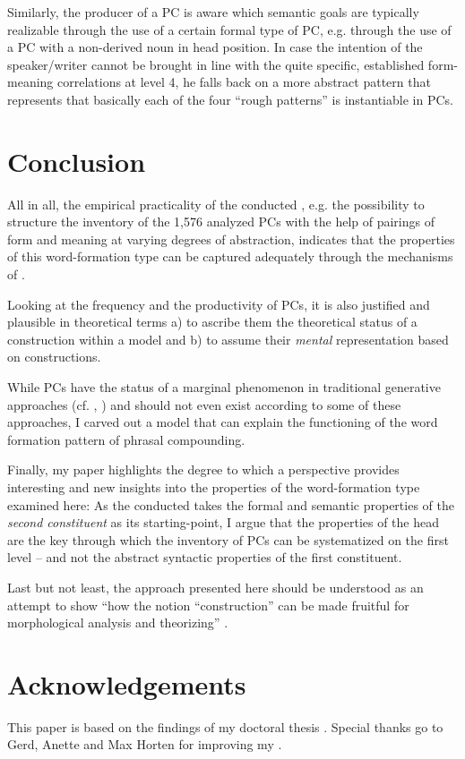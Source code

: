 \documentclass[output=paper]{LSP/langsci}
\begin{document}
Similarly, the producer of a PC is aware which semantic goals are typically realizable through the use of a certain formal type of PC, e.g. through the use of a PC with a non-derived noun in head position. In case the intention of the speaker\slash writer cannot be brought in line with the quite  specific, established form-meaning correlations at level 4,  he falls back on a more abstract pattern that represents that basically each of the four ``rough patterns'' is instantiable in PCs. 


\section{Conclusion}\label{sec:hein:4}
All in all, the empirical practicality of the conducted , e.g. the possibility to structure the inventory of the 1,576 analyzed PCs with the help of pairings of form and meaning at varying degrees of abstraction, indicates that the properties of this word-formation type can be captured adequately through the mechanisms of . 

Looking at the frequency and the productivity of PCs, it is also justified and plausible in theoretical terms a) to ascribe them the theoretical status of a construction within a  model and b) to assume their \textit{mental} representation based on constructions. 

While PCs have the status of a marginal phenomenon in traditional generative approaches (cf. \citealt{Meibauer2003}, \citealt{Hein2011}) and should not even exist according to some of these approaches, I carved out a  model that can explain the functioning of the word formation pattern of phrasal compounding.

Finally, my paper highlights the degree to which a  perspective provides interesting and new insights into the properties of the word-formation type examined here: As the conducted  takes the formal and semantic properties of the \textit{second constituent} as its starting-point, I argue that the properties of the head are the key through which the inventory of PCs can be systematized on the first level -- and not the abstract syntactic properties of the first constituent.

Last but not least, the approach presented here should be understood as an attempt to show ``how the notion ``construction'' can be made fruitful for morphological analysis and theorizing'' \citep[1]{Booij2010}.

\section*{Acknowledgements}

This paper is based on the findings of my doctoral thesis \citep{Hein2015}. Special thanks go to Gerd, Anette and Max Horten for improving my .

{\sloppy
\printbibliography[heading=subbibliography,notkeyword=this]
}
\end{document}
